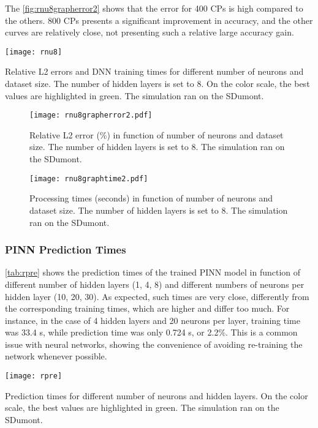 \documentclass[conference]{IEEEtran}
\begin{document}
The \autoref{fig:rnu8grapherror2} shows that the error for 400 CPs is high compared to the others. 800 CPs presents a significant improvement in accuracy, and the other curves are relatively close, not presenting such a relative large accuracy gain.

\begin{table}[htb]\centering
\texttt{[image: rnu8]}
\caption{Relative L2 errors and DNN training times for different number of neurons and dataset size. The number of hidden layers is set to 8. On the color scale, the best values are highlighted in green. The simulation ran on the SDumont.}
\label{tab:rnu8}
\end{table}

\begin{figure}[htb]\centering
\texttt{[image: rnu8grapherror2.pdf]}
\caption{Relative L2 error (\%) in function of number of neurons and dataset size. The number of hidden layers is set to 8. The simulation ran on the SDumont.}
\label{fig:rnu8grapherror2}
\end{figure}

\begin{figure}[htb]\centering
\texttt{[image: rnu8graphtime2.pdf]}
\caption{Processing times (seconds) in function of number of neurons and dataset size. The number of hidden layers is set to 8. The simulation ran on the SDumont.}
\label{fig:rnu8graphtime2}
\end{figure}

\subsubsection{PINN Prediction Times}

\autoref{tab:rpre} shows the prediction times of the trained PINN model in function of different number of hidden layers (1, 4, 8) and different numbers of neurons per hidden layer (10, 20, 30). As expected, such times are very close, differently from the corresponding training times, which are higher and differ too much. For instance,  in the case of 4 hidden layers and 20 neurons per layer, training time was 33.4 s, while prediction time was only 0.724 s, or 2.2\%. This is a common issue with neural networks, showing the convenience of avoiding re-training the network whenever possible.


\begin{table}[htb]\centering
\texttt{[image: rpre]}
\caption{Prediction times for different number of neurons and hidden layers. On the color scale, the best values are highlighted in green. The simulation ran on the SDumont.}
\label{tab:rpre}
\end{table}
\end{document}
